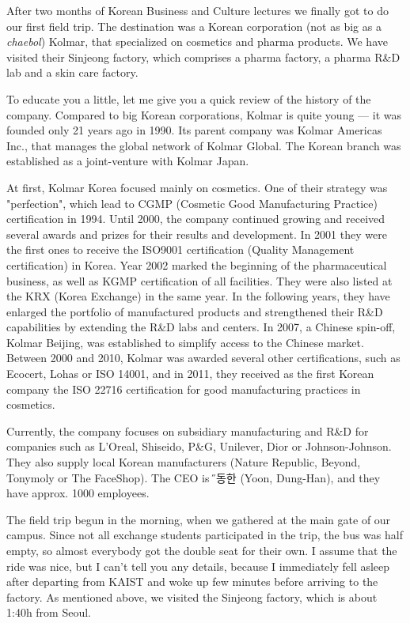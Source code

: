 \begin{post}
	\begin{content}
After two months of Korean Business and Culture lectures we finally got to do our first field trip. The destination was a Korean corporation (not as big as a \textit{chaebol}) Kolmar, that specialized on cosmetics and pharma products. We have visited their Sinjeong factory, which comprises a pharma factory, a pharma R\&D lab and a skin care factory.

To educate you a little, let me give you a quick review of the history of the company. Compared to big Korean corporations, Kolmar is quite young — it was founded only 21 years ago in 1990. Its parent company was Kolmar Americas Inc., that manages the global network of Kolmar Global. The Korean branch was established as a joint-venture with Kolmar Japan.

At first, Kolmar Korea focused mainly on cosmetics. One of their strategy was "perfection", which lead to CGMP (Cosmetic Good Manufacturing Practice) certification in 1994. Until 2000, the company continued growing and received several awards and prizes for their results and development. In 2001 they were the first ones to receive the ISO9001 certification (Quality Management certification) in Korea. Year 2002 marked the beginning of the pharmaceutical business, as well as KGMP certification of all facilities. They were also listed at the KRX (Korea Exchange) in the same year. In the following years, they have enlarged the portfolio of manufactured products and strengthened their R\&D capabilities by extending the R\&D labs and centers. In 2007, a Chinese spin-off, Kolmar Beijing, was established to simplify access to the Chinese market. Between 2000 and 2010, Kolmar was awarded several other certifications, such as Ecocert, Lohas or ISO 14001, and in 2011, they received as the first Korean company the ISO 22716 certification for good manufacturing practices in cosmetics.

Currently, the company focuses on subsidiary manufacturing and R\&D for companies such as L'Oreal, Shiseido, P\&G, Unilever, Dior or Johnson-Johnson. They also supply local Korean manufacturers (Nature Republic, Beyond, Tonymoly or The FaceShop). The CEO is {\H 윤동한} (Yoon, Dung-Han), and they have approx. 1000 employees.

The field trip begun in the morning, when we gathered at the main gate of our campus. Since not all exchange students participated in the trip, the bus was half empty, so almost everybody got the double seat for their own. I assume that the ride was nice, but I can't tell you any details, because I immediately fell asleep after departing from KAIST and woke up few minutes before arriving to the factory. As mentioned above, we visited the Sinjeong factory, which is about 1:40h from Seoul.


\end{content}
\end{post}
